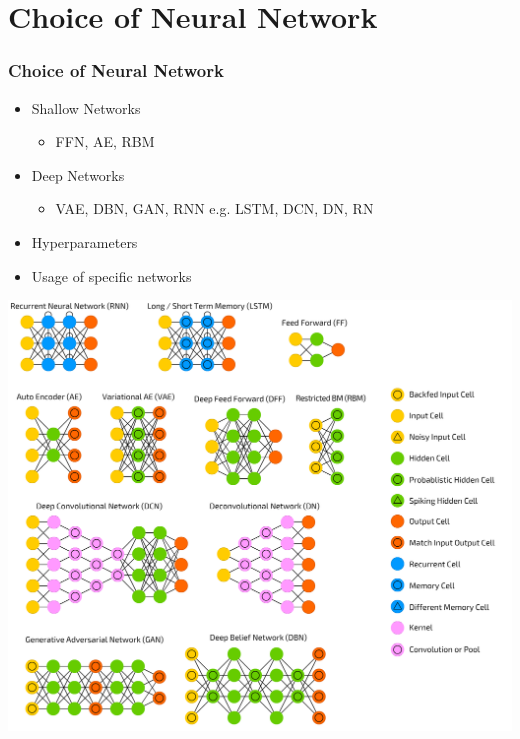 \documentclass{beamer}
\begin{document}
\section{Choice of Neural Network}
\begin{frame}
\frametitle{Choice of Neural Network}
\begin{itemize}
\item Shallow Networks
\begin{itemize}
\item FFN, AE, RBM
\end{itemize}
\item Deep Networks
\begin{itemize}
\item VAE, DBN, GAN, RNN e.g. LSTM, DCN, DN, RN
\end{itemize}
\item Hyperparameters
\item Usage of specific networks
\end{itemize}
\end{frame}

\begin{frame}
\centering
\includegraphics[height=\textheight]{neuralnetworks.png}
\end{frame}
\end{document}
